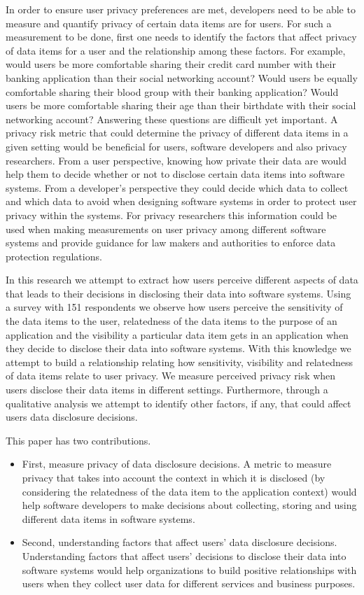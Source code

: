 \documentclass[conference]{IEEEtran}
\begin{document}
In order to ensure user privacy preferences are met, developers need to be able to measure and quantify privacy of certain data items are for users. For such a measurement to be done, first one needs to identify the factors that affect privacy of data items for a user and the relationship among these factors. For example, would users be more comfortable sharing their credit card number with their banking application than their social networking account? Would users be equally comfortable sharing their blood group with their banking application? Would users be more comfortable sharing their age than their birthdate with their social networking account? Answering these questions are difficult yet important. A privacy risk metric that could determine the privacy of different data items in a given setting would be beneficial for users, software developers and also privacy researchers. From a user perspective, knowing how private their data are would help them to decide whether or not to disclose certain data items into software systems. From a developer's perspective they could decide which data to collect and which data to avoid when designing software systems in order to protect user privacy within the systems. For privacy researchers this information could be used when making measurements on user privacy among different software systems and provide guidance for law makers and authorities to enforce data protection regulations.

In this research we attempt to extract how users perceive different aspects of data that leads to their decisions in disclosing their data into software systems. Using a survey with 151 respondents we observe how users perceive the sensitivity of the data items to the user, relatedness of the data items to the purpose of an application and the visibility a particular data item gets in an application when they decide to disclose their data into software systems. With this knowledge we attempt to build a relationship relating how sensitivity, visibility and relatedness of data items relate to user privacy. We measure perceived privacy risk when users disclose their data items in different settings. Furthermore, through a qualitative analysis we attempt to identify other factors, if any, that could affect users data disclosure decisions.

This paper has two contributions.

\begin{itemize}
\item  First, measure privacy of data disclosure decisions. A metric to measure privacy that takes into account the context in which it is disclosed (by considering the relatedness of the data item to the application context) would help software developers to make decisions about collecting, storing and using different data items in software systems. 
\item Second, understanding factors that affect users' data disclosure decisions. Understanding factors that affect users' decisions to disclose their data into software systems would help organizations to build positive relationships with users when they collect user data for different services and business purposes. 
\end{itemize}
\end{document}
